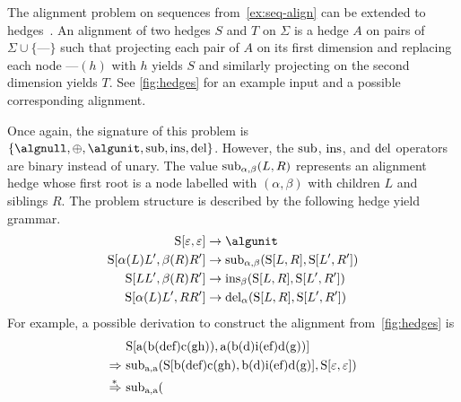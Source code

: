 \begin{example}\label{ex:for-align}
    The alignment problem on sequences from~\cref{ex:seq-align} can be extended to hedges~\parencite{Jiang1995AlignmentTreesAlternative}.
    An alignment of two hedges \(S\) and \(T\) on \(\Sigma\) is a hedge \(A\) on pairs of \(\Sigma \cup \{\text{---}\}\) such that
    projecting each pair of \(A\) on its first dimension and replacing each node \(\text{---}(h)\) with \(h\) yields \(S\)
    and similarly projecting on the second dimension yields \(T\).
    See \cref{fig:hedges} for an example input and a possible corresponding alignment.

    Once again, the signature of this problem is
    \(\{\algnull, \algplus, \algunit, \algsym{sub}, \algsym{ins}, \algsym{del}\}\).
    However, the \(\mathrm{\operatorname{sub}}\), \(\mathrm{\operatorname{ins}}\), and \(\mathrm{\operatorname{del}}\) operators are binary instead of unary.
    The value \(\mathrm{\operatorname{sub}}_{\alpha,\beta}(L, R)\) represents an alignment hedge whose first root is a node labelled with \((\alpha,\beta)\) with children \(L\) and siblings \(R\).
    The problem structure is described by the following hedge yield grammar.
    \begin{align*}
        \gramnt{S}[\varepsilon, \varepsilon] &\rightarrow \algunit \\
        \gramnt{S}[\alpha(L)L', \beta(R)R'] &\rightarrow
            \algsym{sub}_{\alpha,\beta}(\gramnt{S}[L, R], \gramnt{S}[L', R']) \\
        \gramnt{S}[LL', \beta(R)R'] &\rightarrow
            \algsym{ins}_{\beta}(\gramnt{S}[L, R], \gramnt{S}[L', R']) \\
        \gramnt{S}[\alpha(L)L', RR'] &\rightarrow
            \algsym{del}_{\alpha}(\gramnt{S}[L, R], \gramnt{S}[L', R'])
    \end{align*}
    For example, a possible derivation to construct the alignment from~\cref{fig:hedges} is
    \begin{align*}
        &\gramnt{S}[\text{a(b(def)c(gh))}, \text{a(b(d)i(ef)d(g))}] \\
        \gramrew\ &\algsym{sub}_{\text{a},\text{a}}(
            \gramnt{S}[\text{b(def)c(gh)}, \text{b(d)i(ef)d(g)}],
            \gramnt{S}[\varepsilon, \varepsilon]
        ) \\
        \gramRew\ &\algsym{sub}_{\text{a},\text{a}}(

\end{align*}
\end{example}
